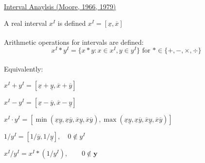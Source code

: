 \documentclass{slides}
\begin{document}
\begin{slide}
\begin{center}
\underline{Interval Anaylsis (Moore, 1966, 1979)}
\end{center}
A real interval $x^I$ is defined 
$x^I = [\underline{x},\overline{x}]$\\
\\
Arithmetic operations for intervals are defined:
$$
x^I * y^I = \{x * y : x \in x^I, y \in y^I \} 
\mbox{ for } * \in \{ +,-,\times,\div\}
$$
\\
Equivalently:

$x^I + y^I = [\underline{x} + \underline{y}, 
 \overline{x}+ \overline{y}]$

$x^I  - y^I = [\underline{x}-\overline{y}, \overline{x}-\underline
{y}]$

$x^I  \cdot y^I = [\min(\underline{x}\underline{y},
    \underline{x}\overline{y}, \overline{x}\underline{y},
    \overline{x}\overline{y}),
  \max(\underline{x}\underline{y}, \underline{x}\overline{y}, 
       \overline{x}\underline{y}, \overline{x}\overline{y})]$

$ 1 / y^I = [1/\overline{y}, 1/\underline{y}], \quad 0 \notin y^I 
$

$x^I  / y^I = x^I * (1/y^I), \qquad 0 \notin \mathbf
{y} $
\end{slide}

\end{document}

